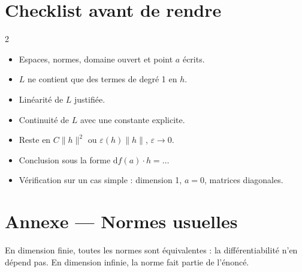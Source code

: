 \documentclass[10pt,a4paper]{article}
\newcommand{\cocher}{\item[\textcolor{vert}{$\mdlgwhtsquare$}]}
\newcommand{\norm}[1]{\lVert #1\rVert}
\newcommand{\diff}{\mathrm{d}}
\begin{document}
\section{Checklist avant de rendre}

\begin{multicols}{2}
\begin{itemize}[leftmargin=1.6em]
\cocher Espaces, normes, domaine ouvert et point $a$ écrits.
\cocher $L$ ne contient que des termes de degré 1 en $h$.
\cocher Linéarité de $L$ justifiée.
\cocher Continuité de $L$ avec une constante explicite.
\cocher Reste en $C\norm{h}^2$ ou $\varepsilon(h)\norm{h}$, $\varepsilon\to0$.
\cocher Conclusion sous la forme $\diff f(a)\cdot h=\dots$
\cocher Vérification sur un cas simple : dimension 1, $a=0$, matrices diagonales.
\end{itemize}
\end{multicols}

\section*{\sffamily\large\bfseries\color{bleu}Annexe — Normes usuelles}

En dimension finie, toutes les normes sont équivalentes : la différentiabilité n'en dépend pas.
En dimension infinie, la norme fait partie de l'énoncé.
\end{document}
